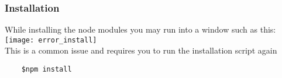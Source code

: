 \subsubsection{Installation}
While installing the node modules you may run into a window such as this:
\texttt{[image: error\_install]} \\[0.5cm]
This is a common issue and requires you to run the installation script again
\begin{verbatim}
	$npm install
\end{verbatim}

